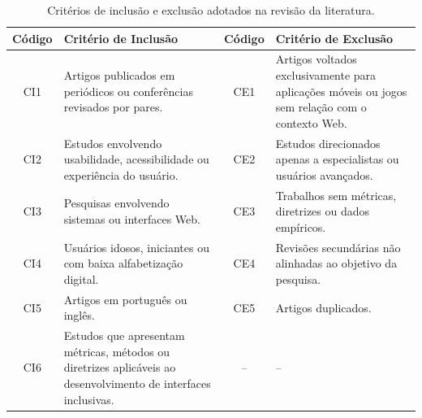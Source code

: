 \begin{table}[H]
\centering

\begin{tabular}{|c|p{5.5cm}|c|p{5.5cm}|}

\hline

\textbf{Código} &
\textbf{Critério de Inclusão}
&
\textbf{Código}
&
\textbf{Critério de Exclusão}

\\ \hline

CI1 & Artigos publicados em periódicos ou conferências revisados por pares. & CE1 & Artigos voltados exclusivamente para aplicações móveis ou jogos sem relação com o contexto Web.
\\ \hline

CI2 & Estudos envolvendo usabilidade, acessibilidade ou experiência do usuário. & CE2 & Estudos direcionados apenas a especialistas ou usuários avançados.
\\ \hline

CI3 & Pesquisas envolvendo sistemas ou interfaces Web. & CE3 & Trabalhos sem métricas, diretrizes ou dados empíricos.
\\ \hline

CI4 & Usuários idosos, iniciantes ou com baixa alfabetização digital. & CE4 & Revisões secundárias não alinhadas ao objetivo da pesquisa.
\\ \hline

CI5 & Artigos em português ou inglês. & CE5 & Artigos duplicados.
\\ \hline

CI6 & Estudos que apresentam métricas, métodos ou diretrizes aplicáveis ao desenvolvimento de interfaces inclusivas. & -- & --
\\ \hline

\end{tabular}

\caption{Critérios de inclusão e exclusão adotados na revisão da literatura.}

\label{tab:criterios}

\end{table}